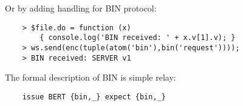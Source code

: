 Or by adding handling for BIN protocol:

\begin{lstlisting}
    > $file.do = function (x)
        { console.log('BIN received: ' + x.v[1].v); }
    > ws.send(enc(tuple(atom('bin'),bin('request'))));
    > BIN received: SERVER v1
\end{lstlisting}
\vspace{1\baselineskip}

The formal description of BIN is simple relay:

\begin{lstlisting}
    issue BERT {bin,_} expect {bin,_}
\end{lstlisting}
